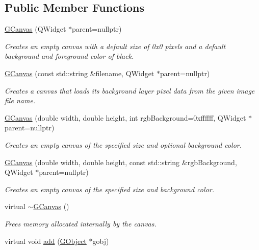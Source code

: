 \subsection*{Public Member Functions}
\begin{DoxyCompactItemize}
\item 
\mbox{\hyperlink{classGCanvas_abb7f95d00cbfadedab276958e1eb2af1}{G\+Canvas}} (Q\+Widget $\ast$parent=nullptr)
\begin{DoxyCompactList}\small\item\em Creates an empty canvas with a default size of 0x0 pixels and a default background and foreground color of black. \end{DoxyCompactList}\item 
\mbox{\hyperlink{classGCanvas_a0a9de139286d0fc9146928aff8f0538c}{G\+Canvas}} (const std\+::string \&filename, Q\+Widget $\ast$parent=nullptr)
\begin{DoxyCompactList}\small\item\em Creates a canvas that loads its background layer pixel data from the given image file name. \end{DoxyCompactList}\item 
\mbox{\hyperlink{classGCanvas_a2c096b9b7c402dd90a507523c8012794}{G\+Canvas}} (double width, double height, int rgb\+Background=0xffffff, Q\+Widget $\ast$parent=nullptr)
\begin{DoxyCompactList}\small\item\em Creates an empty canvas of the specified size and optional background color. \end{DoxyCompactList}\item 
\mbox{\hyperlink{classGCanvas_acc055a20116c6767125897b0a851e5cb}{G\+Canvas}} (double width, double height, const std\+::string \&rgb\+Background, Q\+Widget $\ast$parent=nullptr)
\begin{DoxyCompactList}\small\item\em Creates an empty canvas of the specified size and background color. \end{DoxyCompactList}\item 
virtual \mbox{\hyperlink{classGCanvas_a6b9dcf515cbbdf3432aea0946f5cc15f}{$\sim$\+G\+Canvas}} ()
\begin{DoxyCompactList}\small\item\em Frees memory allocated internally by the canvas. \end{DoxyCompactList}\item 
virtual void \mbox{\hyperlink{classGCanvas_afe8277e7b2627513c6f7452fb0b2847d}{add}} (\mbox{\hyperlink{classGObject}{G\+Object}} $\ast$gobj)

\end{DoxyCompactItemize}
